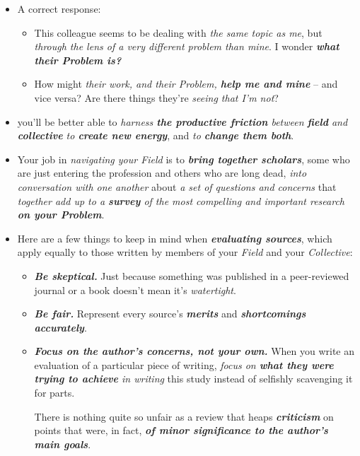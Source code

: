 \documentclass[11pt]{article}
\begin{document}
\begin{itemize}
\item A correct response: 
\begin{itemize}
\item This colleague seems to be dealing with \emph{the same topic as me}, but \emph{through the lens of a very different problem than mine}. I wonder \emph{\textbf{what their Problem is?}}

\item How might \emph{their work, and their Problem, \textbf{help me and mine}} -- and vice versa? Are there things they’re \emph{seeing that I’m not}?
\end{itemize}

\item you’ll be better able to \emph{harness \textbf{the productive friction} between \textbf{field} and \textbf{collective} to \textbf{create new energy}}, and \emph{to \textbf{change them both}}.

\item Your job in \emph{navigating your Field} is to \emph{\textbf{bring together scholars}}, some who are just entering the profession and others who are long dead, \emph{into conversation with one another} about \emph{a set of questions and concerns} that \emph{together add up to a \textbf{survey} of the most compelling and important research \textbf{on your Problem}}.

\item Here are a few things to keep in mind when \emph{\textbf{evaluating sources}}, which apply equally to those written by members of your \emph{Field} and your \emph{Collective}:
\begin{itemize}
\item \emph{\textbf{Be skeptical.}} Just because something was published in a peer-reviewed journal or a book doesn’t mean it's \emph{watertight}.  
\item \emph{\textbf{Be fair.}} Represent every source's \emph{\textbf{merits}} and \emph{\textbf{shortcomings}} \emph{\textbf{accurately}}.
\item \emph{\textbf{Focus on the author’s concerns, not your own.}} When you write an evaluation of a particular piece of writing, \emph{focus on \textbf{what they were trying to achieve} in writing} this study instead of selfishly scavenging it for parts. 

There is nothing quite so unfair as a review that heaps \emph{\textbf{criticism}} on points that were, in fact, \emph{\textbf{of minor significance to the author's main goals}}.
\end{itemize}


\end{itemize}
\end{document}
